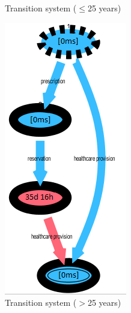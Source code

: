 \begin{figure} [htbp]
\begin{minipage}[t]{0.3\textwidth}
\caption{Transition system ($\leq$25 years)}
\end{minipage}
\begin{minipage}[t]{0.33\textwidth}
\includegraphics[width=\textwidth]{AmbulatorioSojournOlds}
\caption{Transition system ($>$25 years)}
\end{minipage}
\end{figure}\\
